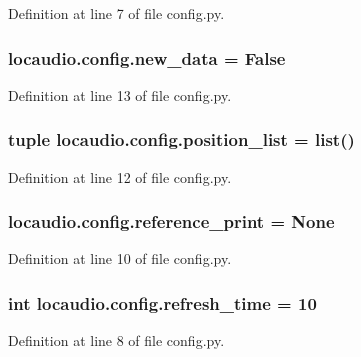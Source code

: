 Definition at line 7 of file config.\-py.

\hypertarget{namespacelocaudio_1_1config_aa8acdbffcae328560e4231de29c2dc1a}{
\subsubsection[{new\-\_\-data}]{\setlength{\rightskip}{0pt plus 5cm}locaudio.\-config.\-new\-\_\-data = False}}\label{namespacelocaudio_1_1config_aa8acdbffcae328560e4231de29c2dc1a}


Definition at line 13 of file config.\-py.

\hypertarget{namespacelocaudio_1_1config_afc387e694f7bc08bccf873238760ce8e}{
\subsubsection[{position\-\_\-list}]{\setlength{\rightskip}{0pt plus 5cm}tuple locaudio.\-config.\-position\-\_\-list = list()}}\label{namespacelocaudio_1_1config_afc387e694f7bc08bccf873238760ce8e}


Definition at line 12 of file config.\-py.

\hypertarget{namespacelocaudio_1_1config_a6c08de266870244fd753c8dc6047bfec}{
\subsubsection[{reference\-\_\-print}]{\setlength{\rightskip}{0pt plus 5cm}locaudio.\-config.\-reference\-\_\-print = None}}\label{namespacelocaudio_1_1config_a6c08de266870244fd753c8dc6047bfec}


Definition at line 10 of file config.\-py.

\hypertarget{namespacelocaudio_1_1config_a7a507b1534e99737ed545a117b87313b}{
\subsubsection[{refresh\-\_\-time}]{\setlength{\rightskip}{0pt plus 5cm}int locaudio.\-config.\-refresh\-\_\-time = 10}}\label{namespacelocaudio_1_1config_a7a507b1534e99737ed545a117b87313b}


Definition at line 8 of file config.\-py.

